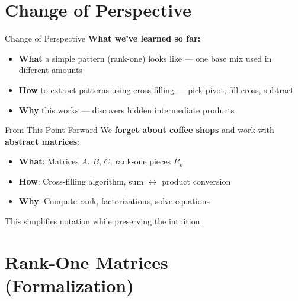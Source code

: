 \documentclass[10pt]{beamer}
\theoremstyle{definition}
\newcommand{\x}[1]{\alert{\textbf{#1}}}
\begin{document}
\section{Change of Perspective}

\begin{frame}{Change of Perspective}
\textbf{What we've learned so far:}
\begin{itemize}
\item \x{What} a simple pattern (rank-one) looks like — one base mix used in different amounts
\item \x{How} to extract patterns using cross-filling — pick pivot, fill cross, subtract
\item \x{Why} this works — discovers hidden intermediate products
\end{itemize}

\vspace{0.5cm}
\begin{alertblock}{From This Point Forward}
We \x{forget about coffee shops} and work with \x{abstract matrices}:
\begin{itemize}
\item \textbf{What}: Matrices $A$, $B$, $C$, rank-one pieces $R_k$
\item \textbf{How}: Cross-filling algorithm, sum $\leftrightarrow$ product conversion
\item \textbf{Why}: Compute rank, factorizations, solve equations
\end{itemize}
\end{alertblock}

\vspace{0.3cm}
This simplifies notation while preserving the intuition.
\end{frame}

\section{Rank-One Matrices (Formalization)}
\end{document}
